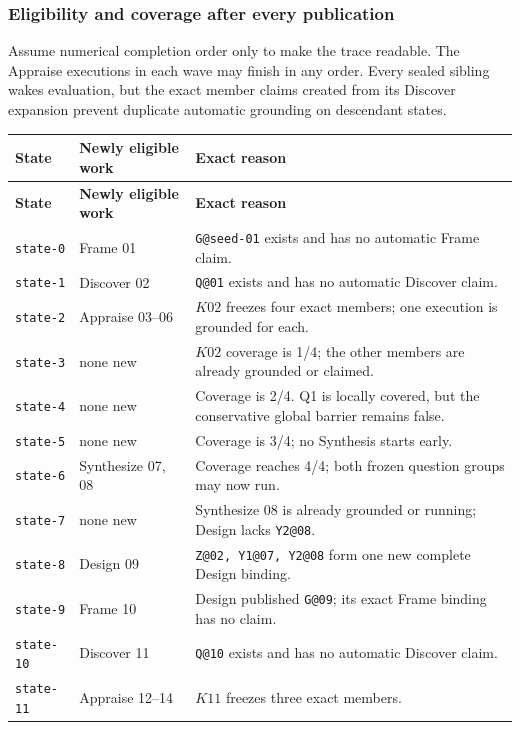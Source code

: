 \documentclass[11pt]{article}
\begin{document}
\subsubsection{Eligibility and coverage after every publication}

Assume numerical completion order only to make the trace readable. The Appraise
executions in each wave may finish in any order. Every sealed sibling wakes
evaluation, but the exact member claims created from its Discover expansion
prevent duplicate automatic grounding on descendant states.

{\scriptsize
\begin{longtable}{@{}L{0.72in}L{1.62in}L{3.73in}@{}}
\toprule
\textbf{State} & \textbf{Newly eligible work} & \textbf{Exact reason} \\
\midrule
\endfirsthead
\toprule
\textbf{State} & \textbf{Newly eligible work} & \textbf{Exact reason} \\
\midrule
\endhead
\texttt{state-0} & Frame 01 & \texttt{G@seed-01} exists and has no automatic Frame claim. \\
\texttt{state-1} & Discover 02 & \texttt{Q@01} exists and has no automatic Discover claim. \\
\texttt{state-2} & Appraise 03--06 & \(K02\) freezes four exact members; one execution is grounded for each. \\
\texttt{state-3} & none new & \(K02\) coverage is 1/4; the other members are already grounded or claimed. \\
\texttt{state-4} & none new & Coverage is 2/4. Q1 is locally covered, but the conservative global barrier remains false. \\
\texttt{state-5} & none new & Coverage is 3/4; no Synthesis starts early. \\
\texttt{state-6} & Synthesize 07, 08 & Coverage reaches 4/4; both frozen question groups may now run. \\
\texttt{state-7} & none new & Synthesize 08 is already grounded or running; Design lacks \texttt{Y2@08}. \\
\texttt{state-8} & Design 09 & \texttt{Z@02, Y1@07, Y2@08} form one new complete Design binding. \\
\texttt{state-9} & Frame 10 & Design published \texttt{G@09}; its exact Frame binding has no claim. \\
\texttt{state-10} & Discover 11 & \texttt{Q@10} exists and has no automatic Discover claim. \\
\texttt{state-11} & Appraise 12--14 & \(K11\) freezes three exact members. \\

\end{longtable}}
\end{document}
